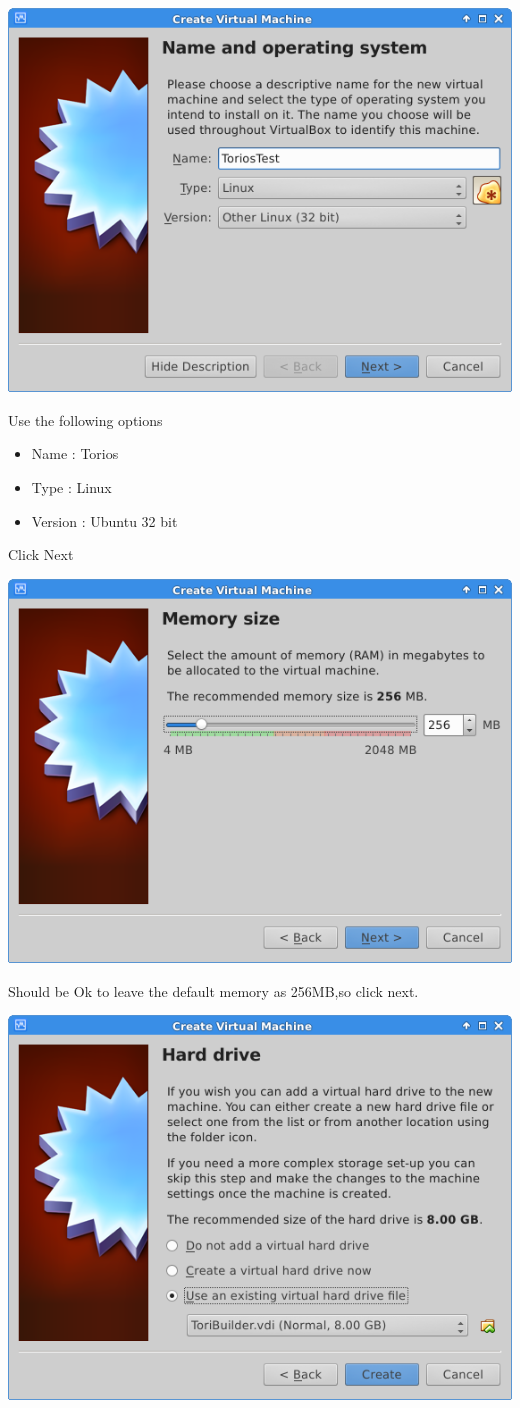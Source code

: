 \documentclass[12pt,a4paper]{book}
\begin{document}
\begin{center}
\item \includegraphics[width=0.7\linewidth]{ToriosTest01}
\end{center}

Use the following options
\begin{itemize}
\item Name : Torios
\item Type : Linux
\item Version : Ubuntu 32 bit
\end{itemize}

Click Next

\begin{center}
\includegraphics[width=0.7\linewidth]{ToriosTest02}
\end{center}

Should be Ok to leave the default memory as 256MB,so click next.

\begin{center}
\includegraphics[width=0.7\linewidth]{ToriosTest03}
\end{center}
\end{document}
